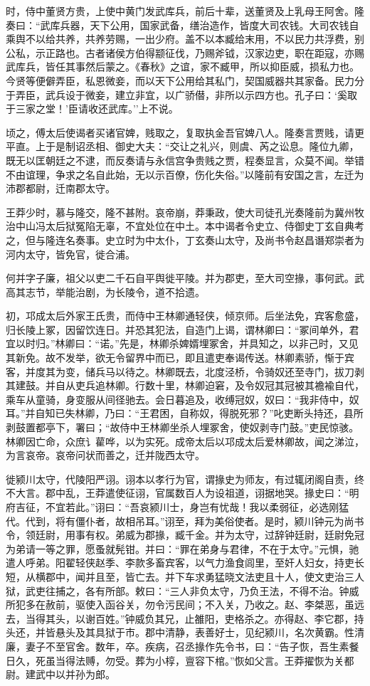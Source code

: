 \documentclass[]{article}
\begin{document}
时，侍中董贤方贵，上使中黄门发武库兵，前后十辈，送董贤及上乳母王阿舍。隆奏曰：``武库兵器，天下公用，国家武备，缮治造作，皆度大司农钱。大司农钱自乘舆不以给共养，共养劳赐，一出少府。盖不以本臧给末用，不以民力共浮费，别公私，示正路也。古者诸侯方伯得颛征伐，乃赐斧钺，汉家边吏，职在距寇，亦赐武库兵，皆任其事然后蒙之。《春秋》之谊，家不臧甲，所以抑臣威，损私力也。今贤等便僻弄臣，私恩微妾，而以天下公用给其私门，契国威器共其家备。民力分于弄臣，武兵设于微妾，建立非宜，以广骄僣，非所以示四方也。孔子曰：`奚取于三家之堂！'臣请收还武库。''上不说。

顷之，傅太后使谒者买诸官婢，贱取之，复取执金吾官婢八人。隆奏言贾贱，请更平直。上于是制诏丞相、御史大夫：``交让之礼兴，则虞、芮之讼息。隆位九卿，既无以匡朝廷之不逮，而反奏请与永信宫争贵贱之贾，程奏显言，众莫不闻。举错不由谊理，争求之名自此始，无以示百僚，伤化失俗。''以隆前有安国之言，左迁为沛郡都尉，迁南郡太守。

王莽少时，慕与隆交，隆不甚附。哀帝崩，莽秉政，使大司徒孔光奏隆前为冀州牧治中山冯太后狱冤陷无辜，不宜处位在中土。本中谒者令史立、侍御史丁玄自典考之，但与隆连名奏事。史立时为中太仆，丁玄奏山太守，及尚书令赵昌谮郑崇者为河内太守，皆免官，徙合浦。

何并字子廉，祖父以吏二千石自平舆徙平陵。并为郡吏，至大司空掾，事何武。武高其志节，举能治剧，为长陵令，道不拾遗。

初，邛成太后外家王氏贵，而侍中王林卿通轻侠，倾京师。后坐法免，宾客愈盛，归长陵上冢，因留饮连日。并恐其犯法，自造门上谒，谓林卿曰：``冢间单外，君宜以时归。''林卿曰：``诺。''先是，林卿杀婢婿埋冢舍，并具知之，以非己时，又见其新免。故不发举，欲无令留界中而已，即且遣吏奉谒传送。林卿素骄，惭于宾客，并度其为变，储兵马以待之。林卿既去，北度泾桥，令骑奴还至寺门，拔刀剥其建鼓。并自从吏兵追林卿。行数十里，林卿迫窘，及令奴冠其冠被其襜褕自代，乘车从童骑，身变服从间径驰去。会日暮追及，收缚冠奴，奴曰：``我非侍中，奴耳。''并自知已失林卿，乃曰：``王君困，自称奴，得脱死邪？''叱吏断头持还，县所剥鼓置都亭下，署曰；``故侍中王林卿坐杀人埋冢舍，使奴剥寺门鼓。''吏民惊骇。林卿因亡命，众庶讠雚哗，以为实死。成帝太后以邛成太后爱林卿故，闻之涕泣，为言哀帝。哀帝问状而善之，迁并陇西太守。

徙颍川太守，代陵阳严诩。诩本以孝行为官，谓掾史为师友，有过辄闭阁自责，终不大言。郡中乱，王莽遣使征诩，官属数百人为设祖道，诩据地哭。掾史曰：``明府吉征，不宜若此。''诩曰：``吾哀颍川士，身岂有忧哉！我以柔弱征，必选刚猛代。代到，将有僵仆者，故相吊耳。''诩至，拜为美俗使者。是时，颍川钟元为尚书令，领廷尉，用事有权。弟威为郡掾，臧千金。并为太守，过辞钟廷尉，廷尉免冠为弟请一等之罪，愿蚤就髡钳。并曰：``罪在弟身与君律，不在于太守。''元惧，驰遣人呼弟。阳翟轻侠赵季、李款多畜宾客，以气力渔食闾里，至奸人妇女，持吏长短，从横郡中，闻并且至，皆亡去。并下车求勇猛晓文法吏且十人，使文吏治三人狱，武吏往捕之，各有所部。敕曰：``三人非负太守，乃负王法，不得不治。钟威所犯多在赦前，驱使入函谷关，勿令污民间；不入关，乃收之。赵、李桀恶，虽远去，当得其头，以谢百姓。''钟威负其兄，止雒阳，吏格杀之。亦得赵、李它郡，持头还，并皆悬头及其具狱于市。郡中清静，表善好士，见纪颍川，名次黄霸。性清廉，妻子不至官舍。数年，卒。疾病，召丞掾作先令书，曰：``告子恢，吾生素餐日久，死虽当得法赙，勿受。葬为小椁，亶容下棺。''恢如父言。王莽擢恢为关都尉。建武中以并孙为郎。
\end{document}
